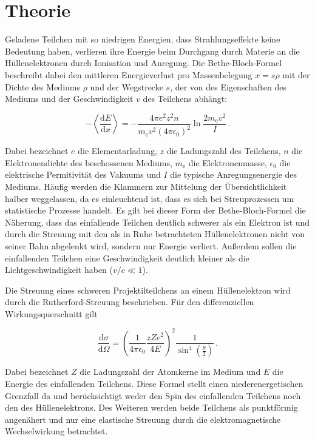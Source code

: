 \section{Theorie}
\label{sec:Theorie}

Geladene Teilchen mit so niedrigen Energien, dass Strahlungseffekte keine Bedeutung haben, verlieren ihre Energie beim Durchgang durch Materie an die Hüllenelektronen durch Ionisation und Anregung. Die Bethe-Bloch-Formel beschreibt dabei den mittleren Energieverlust pro Massenbelegung $x = s \rho$ mit der Dichte des Mediums $\rho$ und der Wegstrecke $s$, der von des Eigenschaften des Mediums und der Geschwindigkeit $v$ des Teilchens abhängt:

\begin{equation}
  -\left<\frac{\mathrm{d}E}{\mathrm{d}x}\right> = - \frac{4\pi e^2 z^2 n}{m_{\mathrm{e}}v^2(4 \pi \epsilon_{\mathrm{0}})^2} \ln{\frac{2 m_{\mathrm{e}} v^2}{I}}\,.
  \label{eqn:bethe}
\end{equation}

Dabei bezeichnet $e$ die Elementarladung, $z$ die Ladungszahl des Teilchens, $n$ die Elektronendichte des beschossenen Mediums, $m_\text{e}$ die Elektronenmasse, $\epsilon_0$ die elektrische Permitivität des Vakuums und $I$ die typische Anregungsenergie des Mediums. Häufig werden die Klammern zur Mittelung der Übersichtlichkeit halber weggelassen, da es einleuchtend ist, dass es sich bei Streuprozessen um statistische Prozesse handelt.
Es gilt bei dieser Form der Bethe-Bloch-Formel die Näherung, dass das einfallende Teilchen deutlich schwerer als ein Elektron ist und durch die Streuung mit den als in Ruhe betrachteten Hüllenelektronen nicht von seiner Bahn abgelenkt wird, sondern nur Energie verliert. Außerdem sollen die einfallenden Teilchen eine Geschwindigkeit deutlich kleiner als die Lichtgeschwindigkeit haben ($v/c \ll 1$).

Die Streuung eines schweren Projektilteilchens an einem Hüllenelektron wird durch die Rutherford-Streuung beschrieben. Für den differenziellen Wirkungsquerschnitt gilt

\begin{equation}
  \frac{\mathrm{d}\sigma}{\mathrm{d}\Omega} = \left( \frac{1}{4\pi\epsilon_0}\frac{z Z e^2}{4 E} \right)^2 \frac{1}{\sin^4\left( \frac{\theta}{2} \right)}\,.
  \label{eqn:rutherford}
\end{equation}

Dabei bezeichnet $Z$ die Ladungszahl der Atomkerne im Medium und $E$ die Energie des einfallenden Teilchens.
Diese Formel stellt einen niederenergetischen Grenzfall da und berücksichtigt weder den Spin des einfallenden Teilchens noch den des Hüllenelektrons. Des Weiteren werden beide Teilchens als punktförmig angenähert und nur eine elastische Streuung durch die elektromagnetische Wechselwirkung betrachtet.


